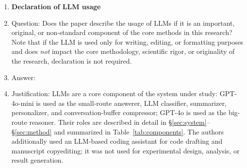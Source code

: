 \begin{enumerate}
\item {\bf Declaration of LLM usage}
    \item[] Question: Does the paper describe the usage of LLMs if it is an important, original, or non-standard component of the core methods in this research? Note that if the LLM is used only for writing, editing, or formatting purposes and does \emph{not} impact the core methodology, scientific rigor, or originality of the research, declaration is not required.
    \item[] Answer: \answerYes{}
    \item[] Justification: LLMs are a core component of the system under study: GPT-4o-mini is used as the small-route answerer, LLM classifier, summarizer, personalizer, and conversation-buffer compressor; GPT-4o is used as the big-route reasoner. Their roles are described in detail in \S\ref{sec:system}--\S\ref{sec:method} and summarized in Table~\ref{tab:components}. The authors additionally used an LLM-based coding assistant for code drafting and manuscript copyediting; it was not used for experimental design, analysis, or result generation.

\end{enumerate}
